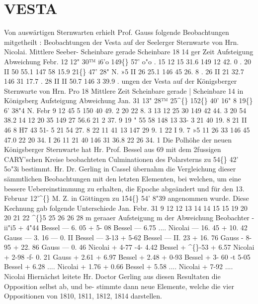 \documentclass[12pt,a4paper]{article}
\newcommand{\degree}{\textdegree}
\begin{document}
\section*{VESTA}
Von  auswärtigen  Sternwarten  erhielt  Prof.  Gauss  folgende  Beobachtungen  mitgetheilt : 
Beobachtungen  der    Vesta  auf  der  Seelerger  Sternwarte  von  Hrn.  Nicolai. 
Mittlere  Seeber- Scheinbare  gerade 
Scheinbare 
18 
14 
ger  Zeit 
Aufsteigung 
Abweichung 
Febr. 
12 
12"  30™  i6'o 
149\degree\{\}  57'     o"o 
. 
15 
12     15     31.6 
149     12    42. 0 
. 
20 
II     50     55.1 
147     58     15.9 
21\degree\{\}  47'  28"  N. 
»5 
II     26     25.1 
146     45     26. 8 
. 
26 
II     21     32.7 
146     31     17.7 
. 
28 
II     II     50.7 
146       3     39.9 
. 
ungen der    Vesta  auf  der  Königsberger  Sternwarte  von  Hrn.    Pro 
18 
Mittlere  Zeit    Scheinbare  gerade  | 
Scheinbare 
14 
in  Königsberg 
Aufsteigung 
Abweichung 
Jan. 
31 
13"  28™  25\textasciicircum\{\} 
152\degree\{\}  40'    16" 8 
19\degree\{\}     6'    38"4  N. 
Febr 
9 
12     45      5 
150    40     49. 2 
20     22       8. 3 
13 
12     25     30 
149     42     44. 3 
20     54     38.2 
14 
12     20     35 
149     27     56.6 
21       2     37. 9 
19 
"     55     58 
148     13     33-  3 
21     40     19. 8 
21 
II     46       8 
H7     43     51- 5 
21     54     27. 8 
22 
11     41     13 
147     29       9. 1 
22       I       9. 7 
»5 
11     26     33 
146     45     47.0 
22     20     34. I 
26 
11     21     40 
146     31     36.8 
22     26     34. 1 
Die  Polhöhe  der  neuen  Königsberger  Sternwarte  hat  Hr.  Prof.  Bessel  aus  69  mit  dem  2fussigen 
CARY'schen  Kreise  beobachteten  Culminationen  des  Polarsterns  zu  54\degree\{\}  42'  5o"3i  bestimmt. 
Hr.  Dr.  Gerling  in  Cassel  übernahm  die  Vergleichung  dieser  sämmtlichen  Beobachtungen  mit  den 
letzten  Elementen,  bei  welchen,  um  eine  bessere  Uebereinstimmung  zu  erhalten,  die  Epoche  abgeändert 
und  für  den  13.  Februar  12'\textasciicircum\{\}  M.  Z.  in  Göttingen  zu  154\degree\{\}  54'  8"39  angenommen  wurde.  Diese  Kechnung 
gab  folgende  Unterschiede 
Jan. 
Febr. 
31 
9 
12 
12 
13 
14 
14 
15 
15 
19 
20 
20 
21 
22 
\textasciicircum\{\}5 
25 
26 
26 
28 
m  geraaer 
Aufsteigung 
m  der 
Abweichung Beobachter 
-  ii"i5 
+    4"44 
Bessel 
---    6.  05 
+    5- 08 
Bessel 
---    6.75 
.... 
Nicolai 
---  16.  45 
+  10.  42 
Gauss 
---    3.  16 
---    0.  II 
Bessel 
---    3-13 
+    5-62 
Bessel 
---  II.  23 
+  16.  76 
Gauss 
-    8-95 
+  22.  86 
Gauss 
---   0.  46 
Nicolai 
+    4-77 
-4-    4.42 
Bessel 
+    \textasciicircum\{\}-53 
+    6.57 
Nicolai 
+    2-98 
-f-    0.  21 
Gauss 
+    2.61 
+    6.97 
Bessel 
+    2.48 
+    0-93 
Bessel 
+    3- 60 
-t     5-05 
Bessel 
+    6.28 
.... 
Nicolai 
+    1.76 
+    0.66 
Bessel 
+    5.58 
.... 
Nicolai 
+    7-92 
.... 
Nicolai 
Hiernächst  leitete  Hr.  Doctor  Gerling   aus  diesen  Resultaten  die   Opposition   selbst   ab,    und  be- 
stimmte dann  neue  Elemente,  welche  die  vier  Oppositionen  von  1810,  1811,  1812,  1814  darstellen. 
\end{document}
